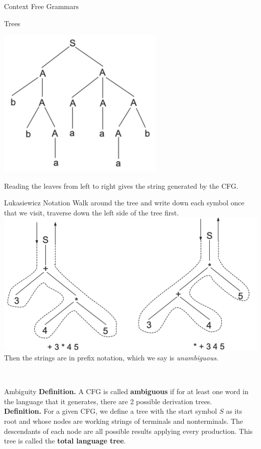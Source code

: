 \documentclass{article}
\begin{document}
\begin{multicols*}{3}
\begin{blackbox}{Context Free Grammars}
\begin{bluebox}{Trees}
        \begin{center}
            \includegraphics[width=0.6\textwidth]{cfg_tree.png}
        \end{center}
        Reading the leaves from left to right gives the string generated by the CFG.
    \end{bluebox}
    \begin{redbox}{Lukasiewicz Notation}
        Walk around the tree and write down each symbol once that we visit, traverse down the left side of the tree first.\\
        \includegraphics[width=1\textwidth]{ln.png}
        Then the strings are in prefix notation, which we say is \emph{unambiguous}.
    \end{redbox}\\[-2ex]
\end{blackbox}
\begin{blackbox}{Ambiguity}
    \textbf{Definition.} A CFG is called \textbf{ambiguous} if for at least one word in the language that it generates, there are 2 possible derivation trees.\\
    \textbf{Definition.} For a given CFG, we define a tree with the start symbol $S$ as its root and whose nodes are working strings of terminals and nonterminals. The descendants of each node are all possible results applying every production. This tree is called the \textbf{total language tree}.\\

\end{blackbox}
\end{multicols*}
\end{document}
